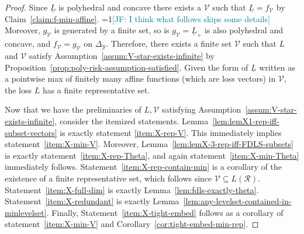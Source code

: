 \documentclass[11pt]{article}
\newcommand{\Comments}{1}
\newcommand{\mynote}[2]{\ifnum\Comments=1\textcolor{#1}{#2}\fi}
\newcommand{\mytodo}[2]{\ifnum\Comments=1%
  \todo[linecolor=#1!80!black,backgroundcolor=#1,bordercolor=#1!80!black]{#2}\fi}
\newcommand{\jessie}[1]{\mynote{teal}{[JF: #1]}}
\newcommand{\jessiet}[1]{\mytodo{teal!20!white}{JF: #1}}
\newcommand{\reals}{\mathbb{R}}
\newcommand{\simplex}{\Delta_\Y}
\newcommand{\R}{\mathcal{R}}
\newcommand{\V}{\mathcal{V}}
\newcommand{\Y}{\mathcal{Y}}
\newcommand{\risk}[1]{\underline{#1}}
\begin{document}
\lemmaX*
\begin{proof}
Since $\risk L$ is polyhedral and concave there exists a $\V$ such that $\risk L = f_\V$ by Claim~\ref{claim:f-min-affine}.
\jessie{I think what follows skips some details}
Moreover, $g_\V$ is generated by a finite set, so is $g_\V = \risk L_+$ is also polyhedral and concave, and $f_\V = g_\V$ on $\simplex$.
Therefore, there exists a finite set $\V$ such that $L$ and $\V$ satisfy Assumption~\ref{assum:V-star-exists-infinite} by Proposition~\ref{prop:poly-risk-assumption-satisfied}.
Given the form of $\risk L$ written as a pointwise max of finitely many affine functions (which are loss vectors) in $\V$, the loss $L$ has a finite representative set. 


Now that we have the preliminaries of $L, \V$ satisfying Assumption~\ref{assum:V-star-exists-infinite}, consider the itemized statements.
Lemma~\ref{lem:lemX1-rep-iff-subset-vectors} is exactly statement \eqref{item:X-rep-V}.
This immediately implies statement~\eqref{item:X-min-V}.
Moreover, Lemma~\ref{lem:lemX-3-rep-iff-FDLS-subsets} is exactly statement~\eqref{item:X-rep-Theta}, and again statement~\eqref{item:X-min-Theta} immediately follows.
Statement~\eqref{item:X-rep-contain-min} is a corollary of the existence of a finite representative set, which follows since $\V \subseteq L(\R)$.
Statement~\eqref{item:X-full-dim} is exactly Lemma~\ref{lem:fdls-exactly-theta}.
Statement~\eqref{item:X-redundant} is exactly Lemma~\ref{lem:any-levelset-contained-in-minlevelset}.
Finally, Statement~\eqref{item:X-tight-embed} follows as a corollary of statement~\eqref{item:X-min-V} and Corollary~\ref{cor:tight-embed-min-rep}.
\end{proof}
\end{document}
